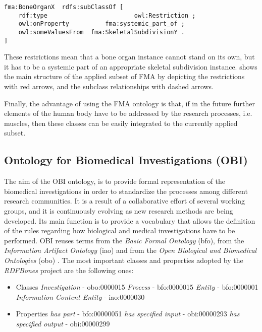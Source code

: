 \begin{lstlisting}[captionpos=b, caption=Rules of the skeletal system defined in OWL, label=fmaOWL, belowskip=1em, aboveskip=2em,
basicstyle=\footnotesize,frame=single]
fma:BoneOrganX	rdfs:subClassOf [
	rdf:type						owl:Restriction ;
	owl:onProperty			fma:systemic_part_of ;
	owl:someValuesFrom	fma:SkeletalSubdivisionY .
]
\end{lstlisting}

These restrictions mean that a bone organ instance cannot stand on its own, but it has to be a systemic part of an appropriate skeletal subdivision instance.  shows the main structure of the applied subset of FMA by depicting the restrictions with red arrows, and the subclass relationships with dashed arrows.


Finally, the advantage of using the FMA ontology is that, if in the future further elements of the human body have to be addressed by the research processes, i.e. muscles, then these classes can be easily integrated to the currently applied subset.

\subsection{Ontology for Biomedical Investigations (OBI)} \label{obi}

The aim of the OBI ontology, is to provide formal representation of the biomedical investigations in order to standardize the processes among different research communities. It is a result of a collaborative effort of several working groups, and it is continuously evolving as new research methods are being developed. Its main function is to provide a vocabulary that allows the definition of the rules regarding how biological and medical investigations have to be performed. OBI reuses terms from the  \textit{Basic Formal Ontology} (bfo), from the \textit{Information Artifact Ontology} (iao) and from the \textit{Open Biological and Biomedical Ontologies} (obo) \cite{10.1371/journal.pone.0154556}. The most important classes and properties adopted by the \textit{RDFBones} project are the following ones:

\begin{itemize}
	\item{Classes}
	\subitem  \textit{Investigation} - obo:0000015
	\subitem  \textit{Process} - bfo:0000015
	\subitem  \textit{Entity} - bfo:0000001
	\subitem  \textit{Information Content Entity} - iao:0000030
	\item{Properties}
	\subitem  \textit{has part} - bfo:00000051
	\subitem  \textit{has specified input} - obi:00000293
	\subitem  \textit{has specified output} - obi:00000299
\end{itemize}

